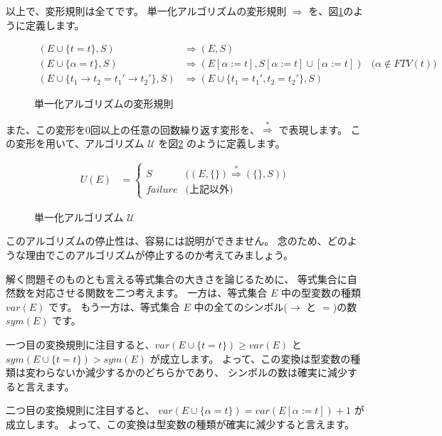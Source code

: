 以上で、変形規則は全てです。
単一化アルゴリズムの変形規則 $\Longrightarrow$ を、図\ref{fig:unification-trans}のように定義します。

\begin{figure}[htbp]
  \begin{align*}
    (E \cup \{t = t\}, S)
      &\Longrightarrow (E, S) \\
    (E \cup \{\alpha = t\}, S)
      &\Longrightarrow (E[\alpha := t], S[\alpha := t] \cup [\alpha := t])
      &\text{($\alpha \notin \mathit{FTV(t)}$)}\\
    (E \cup \{t_1 \to t_2 = t_1' \to t_2'\}, S)
      &\Longrightarrow (E \cup \{t_1 = t_1', t_2 = t_2'\}, S)
  \end{align*}
  \caption{単一化アルゴリズムの変形規則}
  \label{fig:unification-trans}
\end{figure}

また、この変形を0回以上の任意の回数繰り返す変形を、$\stackrel{*}{\Longrightarrow}$ で表現します。
この変形を用いて、アルゴリズム $\mathcal U$ を図\ref{fig:algorithm-u} のように定義します。

\begin{figure}[htbp]
  \begin{align*}
    U(E) &=
    \begin{cases}
      S & \text{($(E, \{\}) \stackrel{*}{\Longrightarrow} (\{\}, S)$)} \\
      \mathit{failure} & \text{(上記以外)}
    \end{cases}
  \end{align*}
  \caption{単一化アルゴリズム $\mathcal U$}
  \label{fig:algorithm-u}
\end{figure}

このアルゴリズムの停止性は、容易には説明ができません。
念のため、どのような理由でこのアルゴリズムが停止するのか考えてみましょう。

解く問題そのものとも言える等式集合の大きさを論じるために、
等式集合に自然数を対応させる関数を二つ考えます。
一方は、等式集合 $E$ 中の型変数の種類 $\mathit{var}(E)$ です。
もう一方は、等式集合 $E$ 中の全てのシンボル($\to$ と $=$)の数 $\mathit{sym}(E)$ です。

一つ目の変換規則に注目すると、$\mathit{var}(E \cup \{t = t\}) \ge \mathit{var}(E)$ と
$\mathit{sym}(E \cup \{t = t\}) > \mathit{sym}(E)$ が成立します。
よって、この変換は型変数の種類は変わらないか減少するかのどちらかであり、
シンボルの数は確実に減少すると言えます。

二つ目の変換規則に注目すると、
$\mathit{var}(E \cup \{\alpha = t\}) = \mathit{var}(E[\alpha := t])+1$ が成立します。
よって、この変換は型変数の種類が確実に減少すると言えます。

